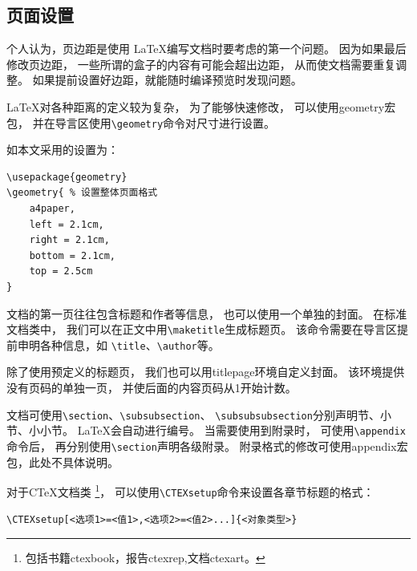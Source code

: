 \documentclass{ctexart}
\numberwithin{equation}{section}			%
\begin{document}
	\subsection{页面设置}
	个人认为，页边距是使用 \LaTeX 编写文档时要考虑的第一个问题。
	因为如果最后修改页边距，
	一些所谓的盒子的内容有可能会超出边距，
	从而使文档需要重复调整。
	如果提前设置好边距，就能随时编译预览时发现问题。
	
	\LaTeX 对各种距离的定义较为复杂，
	为了能够快速修改，
	可以使用geometry宏包，
	并在导言区使用\verb|\geometry|命令对尺寸进行设置。
	
	如本文采用的设置为：
	
\begin{lstlisting}
\usepackage{geometry}
\geometry{ % 设置整体页面格式
	a4paper,
	left = 2.1cm,
	right = 2.1cm,
	bottom = 2.1cm,
	top = 2.5cm
}
\end{lstlisting}
	
	文档的第一页往往包含标题和作者等信息，
	也可以使用一个单独的封面。
	在标准文档类中，
	我们可以在正文中用\verb|\maketitle|生成标题页。
	该命令需要在导言区提前申明各种信息，如
	\verb|\title|、\verb|\author|等。
	
	除了使用预定义的标题页，
	我们也可以用titlepage环境自定义封面。
	该环境提供没有页码的单独一页，
	并使后面的内容页码从1开始计数。
	
	文档可使用\verb|\section|、\verb|\subsubsection|、
	\verb|\subsubsubsection|分别声明节、小节、小小节。
	\LaTeX 会自动进行编号。
	当需要使用到附录时，
	可使用\verb|\appendix|命令后，
	再分别使用\verb|\section|声明各级附录。
	附录格式的修改可使用appendix宏包，此处不具体说明。
	
	对于C\TeX 文档类
	\footnote{包括书籍ctexbook，报告ctexrep,文档ctexart。}，
	可以使用\verb|\CTEXsetup|命令来设置各章节标题的格式：
	
\begin{lstlisting}
\CTEXsetup[<选项1>=<值1>,<选项2>=<值2>...]{<对象类型>}
\end{lstlisting}
\end{document}
